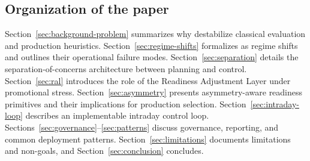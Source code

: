 \subsection{Organization of the paper}
\label{subsec:organization}

Section~\ref{sec:background-problem} summarizes why \LTOs{} destabilize classical evaluation and
production heuristics. Section~\ref{sec:regime-shifts} formalizes \LTOs{} as regime shifts and
outlines their operational failure modes. Section~\ref{sec:separation} details the
separation-of-concerns architecture between planning and control. Section~\ref{sec:ral} introduces
the role of the Readiness Adjustment Layer under promotional stress. Section~\ref{sec:asymmetry}
presents asymmetry-aware readiness primitives and their implications for production selection.
Section~\ref{sec:intraday-loop} describes an implementable intraday control loop.
Sections~\ref{sec:governance}--\ref{sec:patterns} discuss governance, reporting, and common
deployment patterns. Section~\ref{sec:limitations} documents limitations and non-goals, and
Section~\ref{sec:conclusion} concludes.
